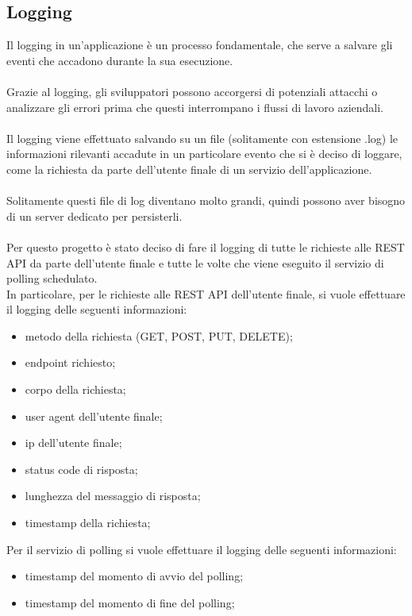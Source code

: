\subsection{Logging}
Il logging in un'applicazione è un processo fondamentale, che serve a salvare gli eventi che accadono durante
la sua esecuzione.
\\\\
Grazie al logging, gli sviluppatori possono accorgersi di potenziali attacchi o analizzare gli
errori prima che questi interrompano i flussi di lavoro aziendali.
\\\\
Il logging viene effettuato salvando su un file (solitamente con estensione .log) le informazioni rilevanti
accadute in un particolare evento che si è deciso di loggare, come la richiesta da parte
dell'utente finale di un servizio dell'applicazione.
\\\\
Solitamente questi file di log diventano molto grandi, quindi possono aver bisogno di un server dedicato per 
persisterli.
\\\\
Per questo progetto è stato deciso di fare il logging di tutte le richieste alle REST API da parte dell'utente
finale e tutte le volte che viene eseguito il servizio di polling schedulato.
\\
In particolare, per le richieste alle REST API dell'utente finale, si vuole effettuare il logging delle seguenti 
informazioni:
\begin{itemize}
    \item metodo della richiesta (GET, POST, PUT, DELETE);
    \item endpoint richiesto;
    \item corpo della richiesta;
    \item user agent dell'utente finale;
    \item ip dell'utente finale;
    \item status code di risposta;
    \item lunghezza del messaggio di risposta;
    \item timestamp della richiesta;
\end{itemize}
\leavevmode\newline
Per il servizio di polling si vuole effettuare il logging delle seguenti informazioni:
\begin{itemize}
    \item timestamp del momento di avvio del polling;
    \item timestamp del momento di fine del polling;
\end{itemize}

